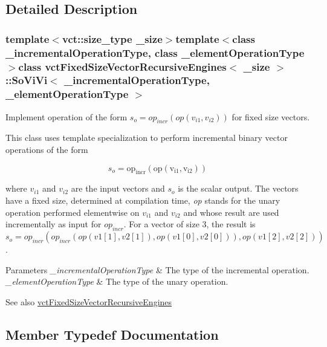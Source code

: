 \subsection{Detailed Description}
\subsubsection*{template$<$vct\+::size\+\_\+type \+\_\+size$>$template$<$class \+\_\+incremental\+Operation\+Type, class \+\_\+element\+Operation\+Type$>$class vct\+Fixed\+Size\+Vector\+Recursive\+Engines$<$ \+\_\+size $>$\+::\+So\+Vi\+Vi$<$ \+\_\+incremental\+Operation\+Type, \+\_\+element\+Operation\+Type $>$}

Implement operation of the form $s_o = op_{incr}(op(v_{i1}, v_{i2}))$ for fixed size vectors. 

This class uses template specialization to perform incremental binary vector operations of the form

\[ s_o = \mathrm{op_{incr}(\mathrm{op}(v_{i1}, v_{i2}))} \]

where $v_{i1}$ and $v_{i2}$ are the input vectors and $s_o$ is the scalar output. The vectors have a fixed size, determined at compilation time, {\itshape op} stands for the unary operation performed elementwise on $v_{i1}$ and $v_{i2}$ and whose result are used incrementally as input for $op_{incr}$. For a vector of size 3, the result is $s_o = op_{incr}(op_{incr}(op(v1[1], v2[1]), op(v1[0], v2[0])), op(v1[2], v2[2]))$.


\begin{DoxyParams}{Parameters}
{\em \+\_\+incremental\+Operation\+Type} & The type of the incremental operation.\\
\hline
{\em \+\_\+element\+Operation\+Type} & The type of the unary operation.\\
\hline
\end{DoxyParams}
\begin{DoxySeeAlso}{See also}
\hyperlink{classvct_fixed_size_vector_recursive_engines}{vct\+Fixed\+Size\+Vector\+Recursive\+Engines} 
\end{DoxySeeAlso}


\subsection{Member Typedef Documentation}
\hypertarget{classvct_fixed_size_vector_recursive_engines_1_1_so_vi_vi_a6d0b7f027e001b57489dcc1314ea016e}{}
